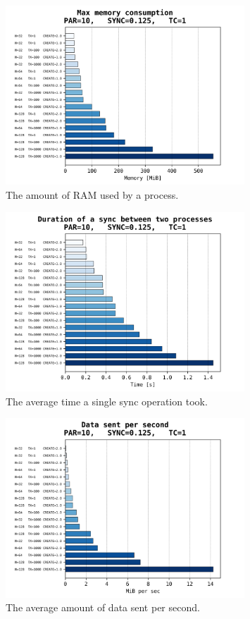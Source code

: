 \documentclass[a4paper,10pt]{article}
\begin{document}
			\begin{figure}[h]
				\centering
				\includegraphics[width=0.8\textwidth]{bar_plots/final_exp2/memory_MiB.png}
				\caption{The amount of RAM used by a process.}
				\label{fig:transactionsRAM}
			\end{figure}
			\begin{figure}[h]
				\centering
				\includegraphics[width=0.8\textwidth]{bar_plots/final_exp2/time_per_sync.png}
				\caption{The average time a single sync operation took.}
				\label{fig:transactionsTimePerSync}
			\end{figure}
			\begin{figure}[h]
				\centering
				\includegraphics[width=0.8\textwidth]{bar_plots/final_exp2/bytes_sent_per_sec.png}
				\caption{The average amount of data sent per second.}
				\label{fig:transactionsBps}
			\end{figure}
		\FloatBarrier
\end{document}
